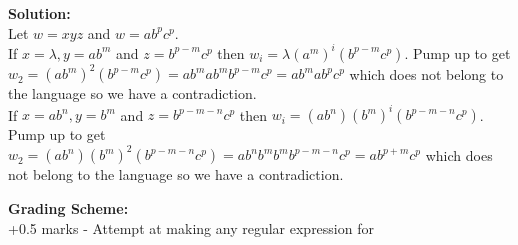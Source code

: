 \documentclass[11pt, article, oneside]{memoir}
\begin{document}
\begin{enumerate}
        \textbf{Solution:}
        \\Let \(w = xyz\) and \(w = ab^pc^p\).
        \\If \(x = \lambda, y = ab^m\) and \(z = b^{p - m}c^p\) then \(w_i = \lambda(a^m)^i(b^{p - m}c^p)\). Pump up to get \(w_2 = (ab^m)^2(b^{p - m}c^p) = ab^mab^mb^{p - m}c^p = ab^mab^pc^p\) which does not belong to the language so we have a contradiction.
        \\If \(x = ab^n, y = b^m\) and \(z = b^{p - m - n}c^p\) then \(w_i = (ab^n)(b^m)^i(b^{p - m - n}c^p)\). Pump up to get \(w_2 = (ab^n)(b^m)^2(b^{p - m - n}c^p) = ab^nb^mb^mb^{p - m - n}c^p = ab^{p + m}c^p\) which does not belong to the language so we have a contradiction.

        \textbf{Grading Scheme:}
        \\+0.5 marks - Attempt at making any regular expression for
        
\end{enumerate}
\end{document}
